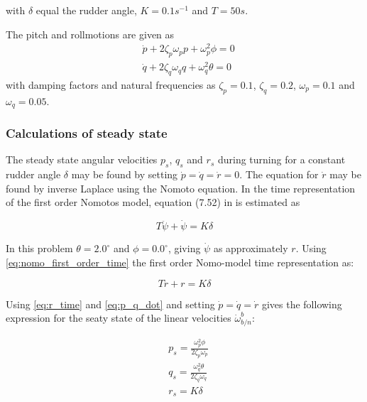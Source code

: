 with $\delta$ equal the rudder angle, $K =0.1 s^{-1}$ and $T = 50s$.

The pitch and rollmotions are given as
\begin{equation}
\begin{aligned}
	&\dot{p} + 2\zeta_p\omega_p p + \omega_p^2 \phi = 0\\
	&\dot{q} + 2\zeta_q\omega_q q + \omega_q^2 \theta = 0
	\label{eq:p_q_dot}
\end{aligned}
\end{equation}
with damping factors and natural  frequencies as $\zeta_p = 0.1 $, $\zeta_q = 0.2 $, $\omega_p = 0.1 $ and $\omega_q = 0.05 $. 

\subsubsection*{Calculations of steady state}

The steady state angular velocities $p_s$, $q_s$ and $r_s$ during turning for a constant rudder angle $\delta$ may be found by setting $\dot{p}= \dot{q} = \dot{r} = 0$. The equation for $\dot{r}$ may be found by inverse Laplace using the Nomoto equation. In \cite{Fossen2011} the time representation of the first order Nomotos model, equation (7.52) in \cite{Fossen2011} is estimated as 

\begin{equation}
    T \ddot{\psi} + \dot{\psi} = K \delta
    \label{eq:nomo_first_order_time}
\end{equation}

In this problem $\theta = 2.0 ^\circ$ and $\phi = 0.0 ^\circ$, giving $\dot{\psi}$ as approximately $r$. Using \eqref{eq:nomo_first_order_time} the  first order Nomo-model time representation as:

\begin{equation}
    T \dot{r} + r = K \delta
    \label{eq:r_time}
\end{equation}

Using \eqref{eq:r_time} and \eqref{eq:p_q_dot} and setting $\dot{p} =\dot{q} = \dot{r}$ gives the following expression for the seaty state of the linear velocities $\dot{\omega}^b_{b/n}$:

\begin{equation}
\begin{aligned}
	& p_s = \frac{\omega_p^2 \phi}{ 2\zeta_p\omega_p} \\
	& q_s = \frac{\omega_q^2 \theta}{2\zeta_q\omega_q} \\
	& r_s = K \delta
	\label{eq:p_q_dot}
\end{aligned}
\end{equation}

